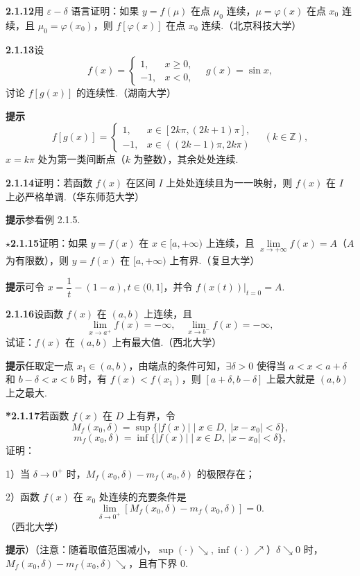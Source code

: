 \documentclass[UTF8, 12pt, fontset=fandol, oneside]{ctexart}
\begin{document}
\noindent\textbf{2.1.12}\quad 用 $\varepsilon-\delta$ 语言证明：如果 $y=f(\mu)$ 在点 $\mu_0$ 连续，$\mu=\varphi(x)$ 在点 $x_0$ 连续，且 $\mu_0=\varphi(x_0)$，则 $f[\varphi(x)]$ 在点 $x_0$ 连续.（北京科技大学）

\noindent\textbf{2.1.13}\quad 设
\[
  f(x)=
  \begin{cases}
    1, & x\ge0,\\
    -1, & x<0,
  \end{cases}
  \quad g(x)=\sin x,
\]
讨论 $f[g(x)]$ 的连续性.（湖南大学）

\noindent\textbf{提示}\quad
\[
  f[g(x)]=
  \begin{cases}
    1, & x\in[2k\pi,(2k+1)\pi],\\
    -1, & x\in((2k-1)\pi,2k\pi)
  \end{cases}
  \quad(k\in\mathbb{Z}),
\]
$x=k\pi$ 处为第一类间断点（$k$ 为整数），其余处处连续.

\noindent\textbf{2.1.14}\quad 证明：若函数 $f(x)$ 在区间 $I$ 上处处连续且为一一映射，则 $f(x)$ 在 $I$ 上必严格单调.（华东师范大学）

\noindent\textbf{提示}\quad 参看例 2.1.5.

\noindent\textbf{$\star$2.1.15}\quad 证明：如果 $y=f(x)$ 在 $x\in[a,+\infty)$ 上连续，且 $\lim\limits_{x\to+\infty}f(x)=A$（$A$ 为有限数），则 $y=f(x)$ 在 $[a,+\infty)$ 上有界.（复旦大学）

\noindent\textbf{提示}\quad 可令 $x=\dfrac1t-(1-a),t\in(0,1]$，并令 $\left.f(x(t))\right|_{t=0}=A$.

\noindent\textbf{2.1.16}\quad 设函数 $f(x)$ 在 $(a,b)$ 上连续，且
\[
  \lim_{x\to a^+}f(x)=-\infty,\quad
  \lim_{x\to b^-}f(x)=-\infty,
\]
试证：$f(x)$ 在 $(a,b)$ 上有最大值.（西北大学）

\noindent\textbf{提示}\quad 任取定一点 $x_1\in(a,b)$，由端点的条件可知，$\exists\delta>0$ 使得当 $a<x<a+\delta$ 和 $b-\delta<x<b$ 时，有 $f(x)<f(x_1)$，则 $[a+\delta,b-\delta]$ 上最大就是 $(a,b)$ 上之最大.

\noindent\textbf{*2.1.17}\quad 若函数 $f(x)$ 在 $D$ 上有界，令
\[
  M_f(x_0,\delta)=\sup\{|f(x)|\mid x\in D,\ |x-x_0|<\delta\},
\]
\[
  m_f(x_0,\delta)=\inf\{|f(x)|\mid x\in D,\ |x-x_0|<\delta\},
\]
证明：

1）当 $\delta\to0^+$ 时，$M_f(x_0,\delta)-m_f(x_0,\delta)$ 的极限存在；

2）函数 $f(x)$ 在 $x_0$ 处连续的充要条件是
\[
  \lim_{\delta\to0^+}[M_f(x_0,\delta)-m_f(x_0,\delta)]=0.
\]
（西北大学）

\noindent\textbf{提示}）（注意：随着取值范围减小，$\sup(\cdot)\searrow,\inf(\cdot)\nearrow$）$\delta\searrow0$ 时，$M_f(x_0,\delta)-m_f(x_0,\delta)\searrow$，且有下界 $0$.
\end{document}
